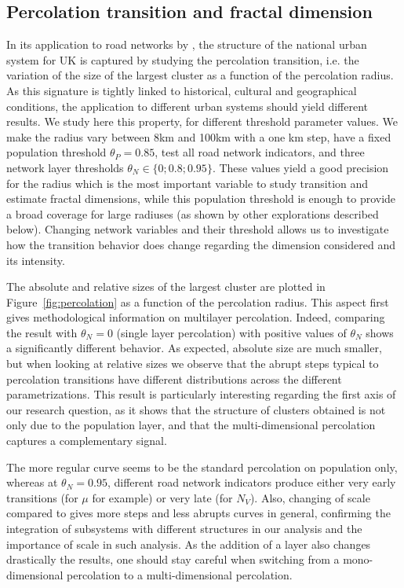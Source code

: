 \documentclass{jimis-en}
\begin{document}
\subsection{Percolation transition and fractal dimension}



In its application to road networks by \cite{arcaute2016cities}, the structure of the national urban system for UK is captured by studying the percolation transition, i.e. the variation of the size of the largest cluster as a function of the percolation radius. As this signature is tightly linked to historical, cultural and geographical conditions, the application to different urban systems should yield different results. We study here this property, for different threshold parameter values. We make the radius vary between 8km and 100km with a one km step, have a fixed population threshold $\theta_P = 0.85$, test all road network indicators, and three network layer thresholds $\theta_N \in \{ 0 ; 0.8 ; 0.95 \}$. These values yield a good precision for the radius which is the most important variable to study transition and estimate fractal dimensions, while this population threshold is enough to provide a broad coverage for large radiuses (as shown by other explorations described below). Changing network variables and their threshold allows us to investigate how the transition behavior does change regarding the dimension considered and its intensity.

The absolute and relative sizes of the largest cluster are plotted in Figure~\ref{fig:percolation} as a function of the percolation radius. This aspect first gives methodological information on multilayer percolation. Indeed, comparing the result with $\theta_N = 0$ (single layer percolation) with positive values of $\theta_N$ shows a significantly different behavior. As expected, absolute size are much smaller, but when looking at relative sizes we observe that the abrupt steps typical to percolation transitions have different distributions across the different parametrizations. This result is particularly interesting regarding the first axis of our research question, as it shows that the structure of clusters obtained is not only due to the population layer, and that the multi-dimensional percolation captures a complementary signal.
 
The more regular curve seems to be the standard percolation on population only, whereas at $\theta_N = 0.95$, different road network indicators produce either very early transitions (for $\mu$ for example) or very late (for $N_V$). Also, changing of scale compared to \cite{arcaute2016cities} gives more steps and less abrupts curves in general, confirming the integration of subsystems with different structures in our analysis and the importance of scale in such analysis. As the addition of a layer also changes drastically the results, one should stay careful when switching from a mono-dimensional percolation to a multi-dimensional percolation.
\end{document}
